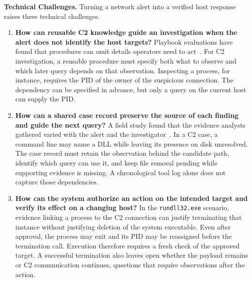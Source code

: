 \documentclass[pdflatex,sn-basic]{sn-jnl}
\DeclareRobustCommand{\circled}[1]{\textcircled{\scriptsize #1}}
\begin{document}
\noindent\textbf{Technical Challenges.} Turning a network alert into a verified host response raises three technical challenges.
\begin{enumerate}[noitemsep, topsep=1pt, partopsep=1pt, listparindent=\parindent, leftmargin=*, label=\circled{\arabic*}]
  \item \textbf{How can reusable C2 knowledge guide an investigation when the alert does not identify the host targets?} Playbook evaluations have found that procedures can omit details operators need to act~\citep{stevens2022ready}. For C2 investigation, a reusable procedure must specify both what to observe and which later query depends on that observation. Inspecting a process, for instance, requires the PID of the owner of the suspicious connection. The dependency can be specified in advance, but only a query on the current host can supply the PID.
  \item \textbf{How can a shared case record preserve the source of each finding and guide the next query?} A field study found that the evidence analysts gathered varied with the alert and the investigator~\citep{kersten2025field}. In a C2 case, a command line may name a DLL while leaving its presence on disk unresolved. The case record must retain the observation behind the candidate path, identify which query can use it, and keep file removal pending while supporting evidence is missing. A chronological tool log alone does not capture those dependencies.
  \item \textbf{How can the system authorize an action on the intended target and verify its effect on a changing host?} In the \texttt{rundll32.exe} scenario, evidence linking a process to the C2 connection can justify terminating that instance without justifying deletion of the system executable. Even after approval, the process may exit and its PID may be reassigned before the termination call. Execution therefore requires a fresh check of the approved target. A successful termination also leaves open whether the payload remains or C2 communication continues, questions that require observations after the action.
\end{enumerate}
\end{document}
